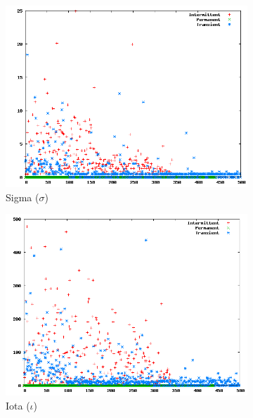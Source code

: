 \begin{figure}
        \centering
			\captionsetup{justification=centering}
        \begin{subfigure}[h]{0.45\linewidth}
                \includegraphics[scale=0.25]{figures/sdsigmap45k.png}
                \caption{Sigma ($\sigma$)}
        \end{subfigure}
        \begin{subfigure}[h]{0.45\linewidth}
                \includegraphics[scale=0.25]{figures/sdiotap45k.png}
                \caption{Iota ($\iota$)}
        \end{subfigure}
			\begin{subfigure}[h]{0.45\linewidth}

\end{subfigure}
\end{figure}
